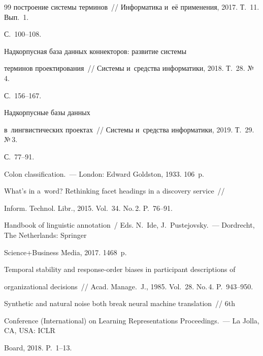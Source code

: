 {{\begin{thebibliography}{99}
построение системы терминов~/\!\!/ Информатика и~её применения, 2017. Т.~11. Вып.~1.  


С.~100--108.




 Надкорпусная база данных коннекторов: развитие системы 


терминов проектирования~/\!\!/ Системы и~средства информатики, 2018. Т.~28. №\,4.  


С.~156--167.







 Надкорпусные базы данных 


в~лингвистических проектах~/\!\!/ Системы и~средства информатики, 2019. Т.~29. №\,3.  


С.~77--91.







 Colon classification.~--- London: Edward Goldston, 1933. 106~p.




 What's in a~word? Rethinking facet headings in a discovery service~/\!\!/ 


Inform. Technol. Libr., 2015. Vol.~34. No.\,2. P.~76--91.




Handbook of linguistic annotation~/ Eds. N.~Ide, J.~Pustejovsky.~--- Dordrecht, The Netherlands: Springer  


Science\;+\;Business Media, 2017. 1468~p.




 Temporal stability and response-order biases in participant descriptions of 


organizational decisions~/\!\!/ Acad. Manage.~J., 1985. Vol.~28. No.\,4. P.~943--950.




 Synthetic and natural noise both break neural machine translation~/\!\!/  6th  


Conference (International) on Learning Representations Proceedings.~--- La Jolla, CA, USA: ICLR 


Board, 2018. P.~1--13. %


  \end{thebibliography}


} }











